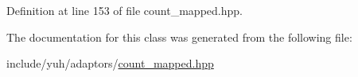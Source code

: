 \-Definition at line 153 of file count\-\_\-mapped.\-hpp.



\-The documentation for this class was generated from the following file\-:\begin{DoxyCompactItemize}
\item 
include/yuh/adaptors/\hyperlink{count__mapped_8hpp}{count\-\_\-mapped.\-hpp}\end{DoxyCompactItemize}
